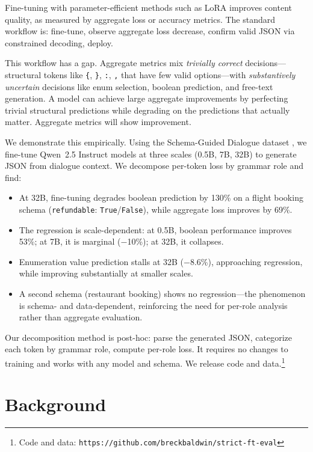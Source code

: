 \documentclass[11pt]{article}
\begin{document}
Fine-tuning with parameter-efficient methods such as LoRA \cite{hu2021lora} improves content quality, as measured by aggregate loss or accuracy metrics. The standard workflow is: fine-tune, observe aggregate loss decrease, confirm valid JSON via constrained decoding, deploy.

This workflow has a gap. Aggregate metrics mix \emph{trivially correct} decisions---structural tokens like \texttt{\{}, \texttt{\}}, \texttt{:}, \texttt{,} that have few valid options---with \emph{substantively uncertain} decisions like enum selection, boolean prediction, and free-text generation. A model can achieve large aggregate improvements by perfecting trivial structural predictions while degrading on the predictions that actually matter. Aggregate metrics will show improvement.

We demonstrate this empirically. Using the Schema-Guided Dialogue dataset \cite{rastogi2020sgd}, we fine-tune Qwen~2.5 Instruct models at three scales (0.5B, 7B, 32B) to generate JSON from dialogue context. We decompose per-token loss by grammar role and find:

\begin{itemize}
\item At 32B, fine-tuning degrades boolean prediction by 130\% on a flight booking schema (\texttt{refundable}: \texttt{True}/\texttt{False}), while aggregate loss improves by 69\%.
\item The regression is scale-dependent: at 0.5B, boolean performance improves 53\%; at 7B, it is marginal ($-$10\%); at 32B, it collapses.
\item Enumeration value prediction stalls at 32B ($-$8.6\%), approaching regression, while improving substantially at smaller scales.
\item A second schema (restaurant booking) shows no regression---the phenomenon is schema- and data-dependent, reinforcing the need for per-role analysis rather than aggregate evaluation.
\end{itemize}

Our decomposition method is post-hoc: parse the generated JSON, categorize each token by grammar role, compute per-role loss. It requires no changes to training and works with any model and schema. We release code and data.\footnote{Code and data: \texttt{https://github.com/breckbaldwin/strict-ft-eval}}

\section{Background}
\end{document}
